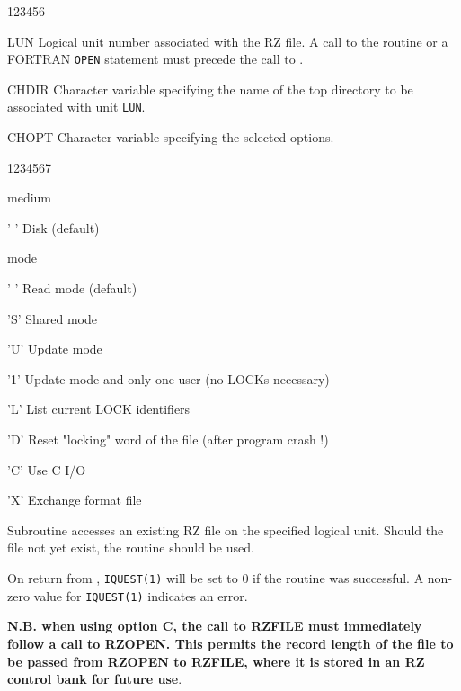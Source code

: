 \begin{DLtt}{123456}
\item[LUN]Logical unit number associated with the RZ file.
A call to the routine  or 
a FORTRAN {\tt OPEN} statement must precede the call to .
\item[CHDIR]Character variable specifying the name of the top directory to be
associated with unit {\tt LUN}.
\item[CHOPT]Character variable specifying the selected options.
\begin{DLtt}{1234567}
\item[medium]
\begin{DLtt}{12}
\item[' ']Disk (default)
\end{DLtt}
\item[mode]
\begin{DLtt}{12}
\item[' ']Read mode (default)
\item['S']Shared mode
\item['U']Update mode
\item['1']Update mode and only one user (no LOCKs necessary)
\item['L']List current LOCK identifiers
\item['D']Reset "locking" word of the file (after program crash !)
\item['C']Use C I/O
\item['X']Exchange format file
\end{DLtt}
\end{DLtt}
\end{DLtt}
\par 
Subroutine  accesses an existing RZ file on the specified
logical unit. Should the file not yet exist, the routine
 should be used.
\par
On return from , {\tt IQUEST(1)}
will be set to 0 if the routine was successful. 
A non-zero value for {\tt IQUEST(1)}
indicates an error.

{\bf N.B. when using option C, the call to RZFILE must 
immediately follow a call to RZOPEN. This permits the
record length of the file to be passed from RZOPEN to RZFILE,
where it is stored in an RZ control bank for future use}.


